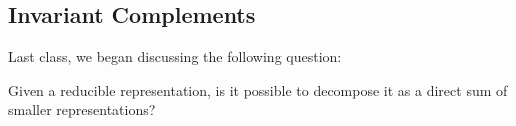 
\subsection{Invariant Complements}

Last class, we began discussing the following question:

\begin{qq}
Given a reducible representation, is it possible to decompose it as a direct sum of smaller representations?
\end{qq}


